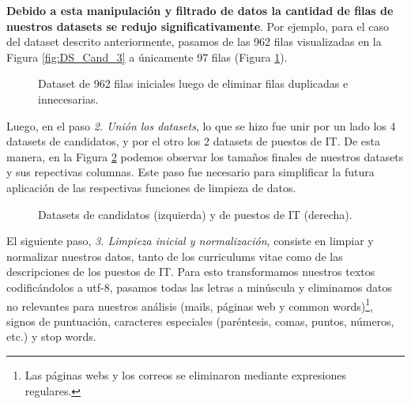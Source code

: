 \documentclass[12pt,a4paper]{article}
\begin{document}
\begin{sloppypar}
\textbf{Debido a esta manipulación y filtrado de datos la cantidad de filas de nuestros datasets se redujo significativamente}. Por ejemplo, para el caso del dataset descrito anteriormente, pasamos de las 962 filas visualizadas en la Figura \ref{fig:DS_Cand_3} a únicamente 97 filas (Figura \ref{fig:DS_Cand_3_sin_dup}). 

\begin{figure}[H] 
 \centering
 \noindent{}
 \caption{Dataset de 962 filas iniciales luego de eliminar filas duplicadas e innecesarias.} 
 \label{fig:DS_Cand_3_sin_dup}
\end{figure}

Luego, en el paso \textit{2. Unión los datasets}, lo que se hizo fue unir por un lado los 4 datasets de candidatos, y por el otro los 2 datasets de puestos de IT. De esta manera, en la Figura \ref{fig:final_antes_preproc} podemos observar los tamaños finales de nuestros datasets y sus repectivas columnas. Este paso fue necesario para simplificar la futura aplicación de las respectivas funciones de limpieza de datos.

\begin{figure}[H] 
 \centering
 \noindent{}
 \caption{Datasets de candidatos (izquierda) y de puestos de IT (derecha).} 
 \label{fig:final_antes_preproc}
\end{figure}

El siguiente paso, \textit{3. Limpieza inicial y normalización}, consiste en limpiar y normalizar nuestros datos, tanto de los curriculums vitae como de las descripciones de los puestos de IT. Para esto transformamos nuestros textos codificándolos a utf-8, pasamos todas las letras a minúscula y eliminamos datos no relevantes para nuestros análisis (mails, páginas web y common words)\footnote{Las páginas webs y los correos se eliminaron mediante expresiones regulares.}, signos de puntuación, caracteres especiales (paréntesis, comas, puntos, números, etc.) y stop words.


\end{sloppypar}
\end{document}
